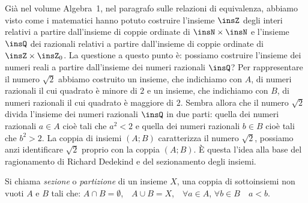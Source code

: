 Già nel volume Algebra~1, nel paragrafo sulle relazioni di equivalenza, abbiamo visto come i matematici hanno potuto costruire l'insieme $\insZ$ degli interi relativi a partire dall'insieme di coppie ordinate di $\insN \times \insN$ e l'insieme $\insQ$ dei razionali relativi a partire dall'insieme di coppie ordinate di $\insZ \times \insZ_{0}$.
La questione a questo punto è: possiamo costruire l'insieme dei numeri reali a partire dall'insieme dei numeri razionali $\insQ$? Per rappresentare il numero $\sqrt{2}$ abbiamo costruito un insieme, che indichiamo con $A$, di numeri razionali il cui quadrato è minore di $2$ e un insieme, che indichiamo con $B$, di numeri razionali il cui quadrato è maggiore di $2$. Sembra allora che il numero $\sqrt{2}$ divida l'insieme dei numeri razionali $\insQ$ in due parti: quella dei numeri razionali $a\in A$ cioè tali che $a^{2}<2$ e quella dei numeri razionali $b\in B$ cioè tali che $b^{2}>2$. La coppia di insiemi $(A;B)$ caratterizza il numero $\sqrt{2}$, possiamo anzi identificare $\sqrt{2}$ proprio con la coppia $(A;B)$.
È questa l'idea alla base del ragionamento di Richard Dedekind e del sezionamento degli insiemi.

\begin{definizione}
Si chiama \emph{sezione} o \emph{partizione} di un insieme $X$, una coppia di sottoinsiemi non vuoti $A$ e $B$ tali che: $A \cap B=\emptyset$,~~$A \cup B=X$,~~$\forall a \in A$, $\forall b \in B$~~$a<b$.
 \end{definizione}

